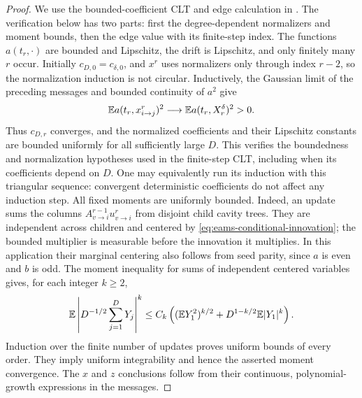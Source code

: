 \begin{proof}
We use the bounded-coefficient CLT and edge calculation in
\cite[Assumptions~2--3, Theorem~3.1, Proposition~2.1, and
Lemmas~4.2--4.3]{EAMS2023}.  The verification below has two parts:
first the degree-dependent normalizers and moment bounds, then the
edge value with its finite-step index.
The functions $a(t_r,\cdot)$ are bounded and Lipschitz, the drift is
Lipschitz, and only finitely many $r$ occur.  Initially
$c_{D,0}=c_{\delta,0}$, and $x^r$ uses normalizers only through
index $r-2$, so the normalization induction is not circular.
Inductively, the Gaussian
limit of the preceding messages and bounded continuity of $a^2$ give
\[
 \mathbb E a(t_r,x^r_{i\to j})^2\longrightarrow
 \mathbb E a(t_r,X^\delta_r)^2>0.
\]
Thus $c_{D,r}$ converges, and the normalized coefficients and their
Lipschitz constants are bounded uniformly for all sufficiently large
$D$.  This verifies the boundedness and normalization hypotheses used
in the finite-step CLT, including when its coefficients depend on $D$.
One may equivalently run its induction with this triangular sequence:
convergent deterministic coefficients do not affect any induction
step. All fixed moments are uniformly bounded. Indeed, an update
sums the columns $A^{r-1}_{v\to i}u^r_{v\to i}$ from disjoint
child cavity trees. They are independent across children and centered
by \eqref{eq:eams-conditional-innovation}; the bounded multiplier
is measurable before the innovation it multiplies. In this application
their marginal centering also follows from seed parity, since $a$ is
even and $b$ is odd. The moment inequality for sums of independent
centered variables gives, for each integer $k\ge2$,
\[
 \mathbb E\left|D^{-1/2}\sum_{j=1}^DY_j\right|^k
 \le C_k\left((\mathbb E Y_1^2)^{k/2}
                  +D^{1-k/2}\mathbb E|Y_1|^k\right).
\]
Induction over the finite number of updates proves uniform bounds of
every order.  They imply uniform integrability and hence the asserted
moment convergence.  The $x$ and $z$ conclusions follow from their
continuous, polynomial-growth expressions in the messages.


\end{proof}
